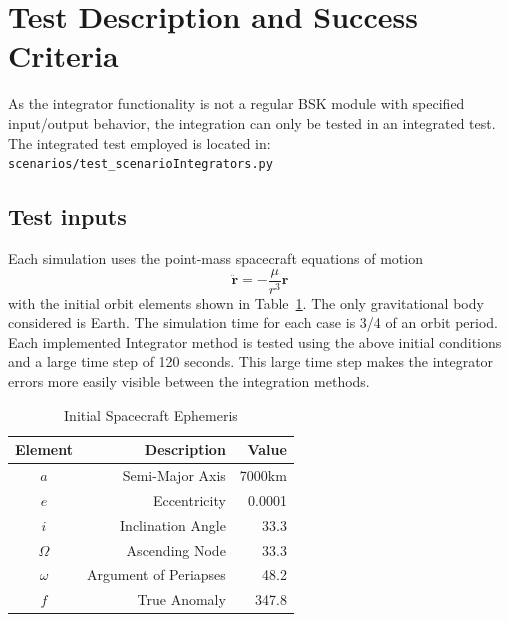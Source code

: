 
\section{Test Description and Success Criteria}

As the integrator functionality is not a regular BSK module with specified input/output behavior, the integration can only be tested in an integrated test.
The integrated test employed is located in:\\

{\tt scenarios/test\_scenarioIntegrators.py}
\\

\subsection{Test inputs}
Each simulation uses the point-mass spacecraft equations of motion
\begin{equation}
	\ddot{\bm r} = - \frac{\mu}{r^{3}}{\bm r}
\end{equation}
with the initial orbit elements shown in Table~\ref{tbl:oeInitial}.  The only gravitational body considered is Earth.  The simulation time for each case is 3/4 of an orbit period.  Each implemented Integrator method is tested using the above initial conditions and a large time step of 120 seconds.  This large time step makes the integrator errors more easily visible between the integration methods.


\begin{table}[htbp]
	\caption{Initial Spacecraft Ephemeris}
	\label{tbl:oeInitial}
	\centering \fontsize{10}{10}\selectfont
	\begin{tabular}{c | r | r } %
		\hline
		\hline
		Element    & Description & Value \\
		\hline
		$a$      & Semi-Major Axis & 7000km \\
		$e$ & Eccentricity     &  0.0001 \\
		$i$       & Inclination Angle  & 33.3\dg \\
		$\Omega$       & Ascending Node   & 33.3\dg \\
		$\omega$       & Argument of Periapses  & 48.2\dg \\
		$f$       & True Anomaly   & 347.8\dg \\
		\hline
		\hline
	\end{tabular}
\end{table}



